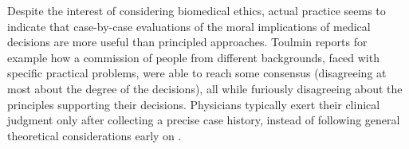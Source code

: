     Despite the interest of considering biomedical ethics, actual practice seems to indicate that case-by-case evaluations of the moral implications of medical decisions are more useful than principled approaches.
    Toulmin\cite{Toulmin1982} reports for example how a commission of people from different backgrounds, faced with specific practical problems, were able to reach some consensus (disagreeing at most about the degree of the decisions), all while furiously disagreeing about the principles supporting their decisions.
    Physicians typically exert their clinical judgment only after collecting a precise case history, instead of following general theoretical considerations early on \cite{Toulmin1982}.
